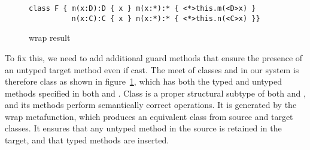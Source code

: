 \documentclass[sigconf]{acmart}
\begin{document}
\begin{figure}[h]
\begin{lstlisting}
class F { m(x:D):D { x } m(x:*):* { <*>this.m(<D>x) }
          n(x:C):C { x } n(x:*):* { <*>this.n(<C>x) }}
\end{lstlisting}
\caption{wrap result}
\label{fig:monwrap}
\end{figure}

To fix this, we need to add additional guard methods that ensure the
presence of an untyped target method even if cast. The meet of classes \C
and \D in our system is therefore class  as shown in
figure~\ref{fig:monwrap}, which has both the typed and untyped methods
specified in both \C and \D. Class  is a proper structural subtype of
both \C and \D, and its methods perform semantically correct operations. It
is generated by the wrap metafunction, which produces an equivalent class
from source and target classes. It ensures that any untyped method in the
source is retained in the target, and that typed methods are inserted.
\end{document}
